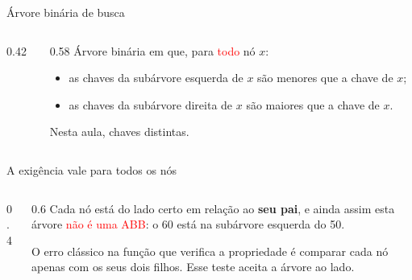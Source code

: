 \documentclass{beamer}
\newcommand{\tcr}[1]{\textcolor{red}{#1}}
\begin{document}
\begin{frame}{Árvore binária de busca}
  \begin{columns}
    \begin{column}{0.42\textwidth}
      \centering
    \end{column}
    \begin{column}{0.58\textwidth}
      Árvore binária em que, para \tcr{todo} nó $x$:
      \begin{itemize}
        \item as chaves da subárvore esquerda de $x$ são menores que a chave de
              $x$;
        \item as chaves da subárvore direita de $x$ são maiores que a chave de
              $x$.
      \end{itemize}

      \vspace{0.3cm}
      Nesta aula, chaves distintas.
    \end{column}
  \end{columns}
\end{frame}

\begin{frame}{A exigência vale para todos os nós}
  \begin{columns}
    \begin{column}{0.4\textwidth}
      \centering
    \end{column}
    \begin{column}{0.6\textwidth}
      Cada nó está do lado certo em relação ao \textbf{seu pai}, e ainda assim
      esta árvore \tcr{não é uma ABB}: o 60 está na subárvore esquerda do 50.

      \vspace{0.3cm}
      O erro clássico na função que verifica a propriedade é comparar cada nó
      apenas com os seus dois filhos. Esse teste aceita a árvore ao lado.
    \end{column}
  \end{columns}
\end{frame}
\end{document}
